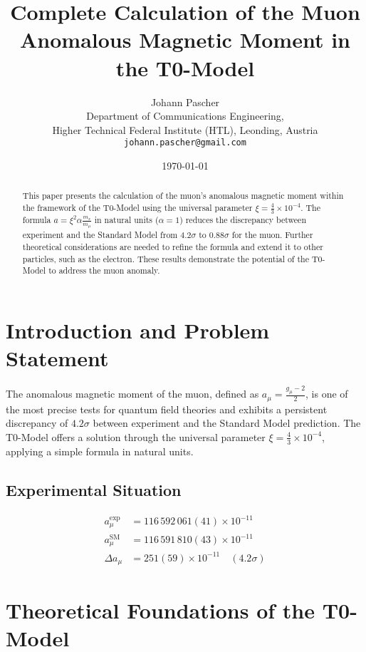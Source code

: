 \documentclass[12pt,a4paper]{article}
\title{Complete Calculation of the Muon Anomalous Magnetic Moment in the T0-Model}
\author{Johann Pascher\\
	Department of Communications Engineering, \\Higher Technical Federal Institute (HTL), Leonding, Austria\\
	\texttt{johann.pascher@gmail.com}}
\date{\today}
\newcommand{\xipar}{\xi}
\begin{document}
	
	\maketitle
	
	\begin{abstract}
		This paper presents the calculation of the muon's anomalous magnetic moment within the framework of the T0-Model using the universal parameter \(\xipar = \frac{4}{3} \times 10^{-4}\). The formula \(a = \xipar^2 \alpha \frac{m_x}{m_\mu}\) in natural units (\(\alpha = 1\)) reduces the discrepancy between experiment and the Standard Model from \(4.2\sigma\) to \(0.88\sigma\) for the muon. Further theoretical considerations are needed to refine the formula and extend it to other particles, such as the electron. These results demonstrate the potential of the T0-Model to address the muon anomaly.
	\end{abstract}
	
	\tableofcontents
	\newpage
	
	\section{Introduction and Problem Statement}
	
	The anomalous magnetic moment of the muon, defined as \(a_\mu = \frac{g_\mu - 2}{2}\), is one of the most precise tests for quantum field theories and exhibits a persistent discrepancy of \(4.2\sigma\) between experiment and the Standard Model prediction. The T0-Model offers a solution through the universal parameter \(\xipar = \frac{4}{3} \times 10^{-4}\), applying a simple formula in natural units.
	
	\subsection{Experimental Situation}
	
	\begin{align}
		a_\mu^{\text{exp}} &= 116\,592\,061(41) \times 10^{-11} \label{eq:exp} \\
		a_\mu^{\text{SM}} &= 116\,591\,810(43) \times 10^{-11} \label{eq:sm} \\
		\Delta a_\mu &= 251(59) \times 10^{-11} \quad (4.2\sigma) \label{eq:disc}
	\end{align}
	
	\section{Theoretical Foundations of the T0-Model}
	
\end{document}
